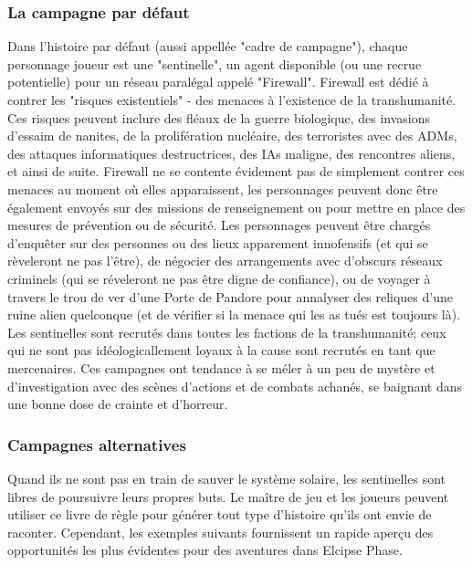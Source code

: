 \subsubsection{La campagne par défaut} \label{sec:default-campaign} 

Dans l'histoire par défaut (aussi appellée "cadre de campagne"), chaque personnage joueur est une "sentinelle", un agent disponible (ou une recrue potentielle) pour un réseau paralégal appelé "Firewall". Firewall est dédié à contrer les "risques existentiels" - des menaces à l'existence de la transhumanité. Ces risques peuvent inclure des fléaux de la guerre biologique, des invasions d'essaim de nanites, de la prolifération nucléaire, des terroristes avec des ADMs, des attaques informatiques destructrices, des IAs maligne, des rencontres aliens, et ainsi de suite. Firewall ne se contente évidement pas de simplement contrer ces menaces au moment où elles apparaissent, les personnages peuvent donc être également envoyés sur des missions de renseignement ou pour mettre en place des mesures de prévention ou de sécurité. Les personnages peuvent être chargés d'enquêter sur des personnes ou des lieux apparement innofensifs (et qui se rèveleront ne pas l'être), de négocier des arrangements avec d'obscurs réseaux criminels (qui se réveleront ne pas être digne de confiance), ou de voyager à travers le trou de ver d'une Porte de Pandore pour annalyser des reliques d'une ruine alien quelconque (et de vérifier si la menace qui les as tués est toujours là). Les sentinelles sont recrutés dans toutes les factions de la transhumanité; ceux qui ne sont pas idéologicallement loyaux à la cause sont recrutés en tant que mercenaires. Ces campagnes ont tendance à se méler à un peu de mystère et d'investigation avec des scènes d'actions et de combats achanés, se baignant dans une bonne dose de crainte et d'horreur. 



\subsubsection{Campagnes alternatives} \label{sec:alternate-campaigns} 

Quand ils ne sont pas en train de sauver le système solaire, les sentinelles sont libres de poursuivre leurs propres buts. Le maître de jeu et les joueurs peuvent utiliser ce livre de règle pour générer tout type d'histoire qu'ils ont envie de raconter. Cependant, les exemples suivants fournissent un rapide aperçu des opportunités les plus évidentes pour des aventures dans Elcipse Phase. 

